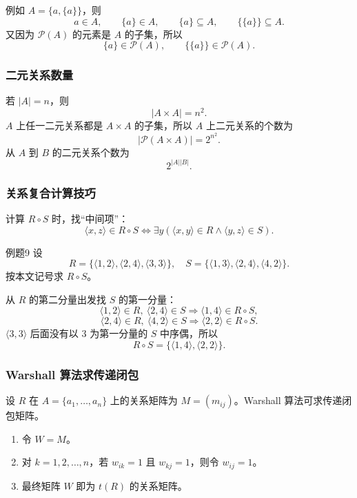 例如 \(A=\{a,\{a\}\}\)，则
\[
a\in A,\qquad \{a\}\in A,\qquad \{a\}\subseteq A,\qquad \{\{a\}\}\subseteq A.
\]
又因为 \(\mathcal P(A)\) 的元素是 \(A\) 的子集，所以
\[
\{a\}\in\mathcal P(A),\qquad \{\{a\}\}\in\mathcal P(A).
\]

\subsubsection{二元关系数量}

若 \(|A|=n\)，则
\[
|A\times A|=n^2.
\]
\(A\) 上任一二元关系都是 \(A\times A\) 的子集，所以 \(A\) 上二元关系的个数为
\[
|\mathcal P(A\times A)|=2^{n^2}.
\]
从 \(A\) 到 \(B\) 的二元关系个数为
\[
2^{|A||B|}.
\]

\subsubsection{关系复合计算技巧}

计算 \(R\circ S\) 时，找“中间项”：
\[
\langle x,z\rangle\in R\circ S
\Leftrightarrow
\exists y(\langle x,y\rangle\in R\land\langle y,z\rangle\in S).
\]

\begin{question}{例题9}
	设
	\[
	R=\{\langle1,2\rangle,\langle2,4\rangle,\langle3,3\rangle\},
	\quad
	S=\{\langle1,3\rangle,\langle2,4\rangle,\langle4,2\rangle\}.
	\]
	按本文记号求 \(R\circ S\)。
	
	\begin{solution}
	从 \(R\) 的第二分量出发找 \(S\) 的第一分量：
	\[
	\langle1,2\rangle\in R,\ \langle2,4\rangle\in S\Rightarrow\langle1,4\rangle\in R\circ S,
	\]
	\[
	\langle2,4\rangle\in R,\ \langle4,2\rangle\in S\Rightarrow\langle2,2\rangle\in R\circ S.
	\]
	\(\langle3,3\rangle\) 后面没有以 \(3\) 为第一分量的 \(S\) 中序偶，所以
	\[
	R\circ S=\{\langle1,4\rangle,\langle2,2\rangle\}.
	\]
	\end{solution}
\end{question}

\subsubsection{Warshall 算法求传递闭包}

设 \(R\) 在 \(A=\{a_1,\dots,a_n\}\) 上的关系矩阵为 \(M=(m_{ij})\)。Warshall 算法可求传递闭包矩阵。

\begin{enumerate}
	\item 令 \(W=M\)。
	\item 对 \(k=1,2,\dots,n\)，若 \(w_{ik}=1\) 且 \(w_{kj}=1\)，则令 \(w_{ij}=1\)。
	\item 最终矩阵 \(W\) 即为 \(t(R)\) 的关系矩阵。
\end{enumerate}

